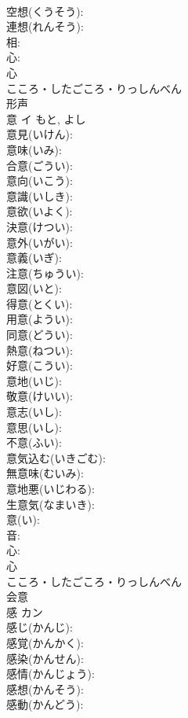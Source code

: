\documentclass[8pt]{extreport}
\begin{document}
\begin{CJK}{UTF8}{min}
\\	空想(くうそう): 
\\	連想(れんそう): 
\\	相: 
\\	心: 
\\	心	
\\	こころ・したごころ・りっしんべん	
\\	形声 
\\	意	イ		もと, よし	
\\	意見(いけん): 
\\	意味(いみ): 
\\	合意(ごうい): 
\\	意向(いこう): 
\\	意識(いしき): 
\\	意欲(いよく): 
\\	決意(けつい): 
\\	意外(いがい): 
\\	意義(いぎ): 
\\	注意(ちゅうい): 
\\	意図(いと): 
\\	得意(とくい): 
\\	用意(ようい): 
\\	同意(どうい): 
\\	熱意(ねつい): 
\\	好意(こうい): 
\\	意地(いじ): 
\\	敬意(けいい): 
\\	意志(いし): 
\\	意思(いし): 
\\	不意(ふい): 
\\	意気込む(いきごむ): 
\\	無意味(むいみ): 
\\	意地悪(いじわる): 
\\	生意気(なまいき): 
\\	意(い): 
\\	音: 
\\	心: 
\\	心	
\\	こころ・したごころ・りっしんべん	
\\	会意 
\\	感	カン			
\\	感じ(かんじ): 
\\	感覚(かんかく): 
\\	感染(かんせん): 
\\	感情(かんじょう): 
\\	感想(かんそう): 
\\	感動(かんどう): 

\end{CJK}
\end{document}
